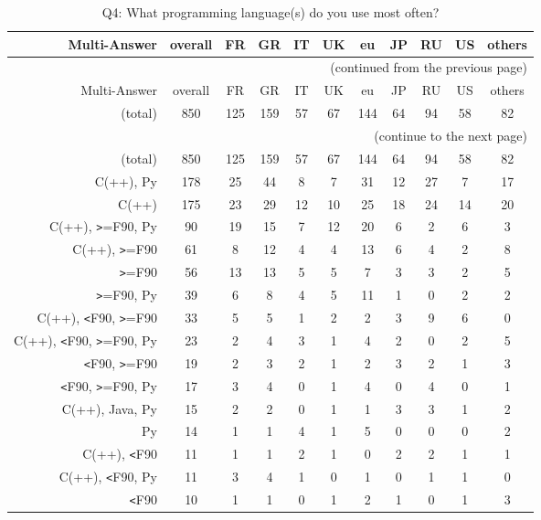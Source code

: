 \clearpage%
{\footnotesize\begin{landscape}%
\begin{longtable}[htb]{r|c|c|c|c|c|c|c|c|c|c}%
\caption{Q4: What programming language(s) do you use most often?}%
\label{tab:Q4-mans} \\%
\hline%
Multi-Answer & overall & FR & GR & IT & UK & eu & JP & RU & US & others \\
 \hline%
\endfirsthead%
\multicolumn{11}{r}{(continued from the previous page)}\\%
\hline%
Multi-Answer & overall & FR & GR & IT & UK & eu & JP & RU & US & others \\
 \hline%
\endhead%
\hline%
(total) & 850 & 125 & 159 & 57 & 67 & 144 & 64 & 94 & 58 & 82 \\%
\hline%
\multicolumn{11}{r}{(continue to the next page)}\\%
\endfoot%
\hline%
(total) & 850 & 125 & 159 & 57 & 67 & 144 & 64 & 94 & 58 & 82 \\%
\hline%
\endlastfoot%
\hline%
{C(++), Py} & 178 & 25 & 44 & 8 & 7 & 31 & 12 & 27 & 7 & 17 \\%
{C(++)} & 175 & 23 & 29 & 12 & 10 & 25 & 18 & 24 & 14 & 20 \\%
{C(++), \verb!>!=F90, Py} & 90 & 19 & 15 & 7 & 12 & 20 & 6 & 2 & 6 & 3 \\%
{C(++), \verb!>!=F90} & 61 & 8 & 12 & 4 & 4 & 13 & 6 & 4 & 2 & 8 \\%
{\verb!>!=F90} & 56 & 13 & 13 & 5 & 5 & 7 & 3 & 3 & 2 & 5 \\%
{\verb!>!=F90, Py} & 39 & 6 & 8 & 4 & 5 & 11 & 1 & 0 & 2 & 2 \\%
{C(++), \verb!<!F90, \verb!>!=F90} & 33 & 5 & 5 & 1 & 2 & 2 & 3 & 9 & 6 & 0 \\%
{C(++), \verb!<!F90, \verb!>!=F90, Py} & 23 & 2 & 4 & 3 & 1 & 4 & 2 & 0 & 2 & 5 \\%
{\verb!<!F90, \verb!>!=F90} & 19 & 2 & 3 & 2 & 1 & 2 & 3 & 2 & 1 & 3 \\%
{\verb!<!F90, \verb!>!=F90, Py} & 17 & 3 & 4 & 0 & 1 & 4 & 0 & 4 & 0 & 1 \\%
{C(++), Java, Py} & 15 & 2 & 2 & 0 & 1 & 1 & 3 & 3 & 1 & 2 \\%
{Py} & 14 & 1 & 1 & 4 & 1 & 5 & 0 & 0 & 0 & 2 \\%
{C(++), \verb!<!F90} & 11 & 1 & 1 & 2 & 1 & 0 & 2 & 2 & 1 & 1 \\%
{C(++), \verb!<!F90, Py} & 11 & 3 & 4 & 1 & 0 & 1 & 0 & 1 & 1 & 0 \\%
{\verb!<!F90} & 10 & 1 & 1 & 0 & 1 & 2 & 1 & 0 & 1 & 3 \\%

\end{longtable}
\end{landscape}}

